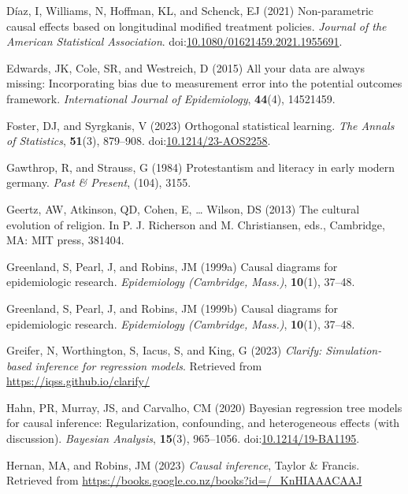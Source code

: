 \documentclass[
  singlecolumn,
  9pt]{article}
\begin{document}
\begin{CSLReferences}
Díaz, I, Williams, N, Hoffman, KL, and Schenck, EJ (2021) Non-parametric
causal effects based on longitudinal modified treatment policies.
\emph{Journal of the American Statistical Association}.
doi:\href{https://doi.org/10.1080/01621459.2021.1955691}{10.1080/01621459.2021.1955691}.

Edwards, JK, Cole, SR, and Westreich, D (2015) All your data are always
missing: Incorporating bias due to measurement error into the potential
outcomes framework. \emph{International Journal of Epidemiology},
\textbf{44}(4), 14521459.

Foster, DJ, and Syrgkanis, V (2023) Orthogonal statistical learning.
\emph{The Annals of Statistics}, \textbf{51}(3), 879--908.
doi:\href{https://doi.org/10.1214/23-AOS2258}{10.1214/23-AOS2258}.

Gawthrop, R, and Strauss, G (1984) Protestantism and literacy in early
modern germany. \emph{Past \& Present}, (104), 3155.

Geertz, AW, Atkinson, QD, Cohen, E, \ldots{} Wilson, DS (2013) The
cultural evolution of religion. In P. J. Richerson and M. Christiansen,
eds., Cambridge, MA: MIT press, 381404.

Greenland, S, Pearl, J, and Robins, JM (1999a) Causal diagrams for
epidemiologic research. \emph{Epidemiology (Cambridge, Mass.)},
\textbf{10}(1), 37--48.

Greenland, S, Pearl, J, and Robins, JM (1999b) Causal diagrams for
epidemiologic research. \emph{Epidemiology (Cambridge, Mass.)},
\textbf{10}(1), 37--48.

Greifer, N, Worthington, S, Iacus, S, and King, G (2023) \emph{Clarify:
Simulation-based inference for regression models}. Retrieved from
\url{https://iqss.github.io/clarify/}

Hahn, PR, Murray, JS, and Carvalho, CM (2020) Bayesian regression tree
models for causal inference: Regularization, confounding, and
heterogeneous effects (with discussion). \emph{Bayesian Analysis},
\textbf{15}(3), 965--1056.
doi:\href{https://doi.org/10.1214/19-BA1195}{10.1214/19-BA1195}.

Hernan, MA, and Robins, JM (2023) \emph{Causal inference}, Taylor \&
Francis. Retrieved from
\url{https://books.google.co.nz/books?id=/_KnHIAAACAAJ}


\end{CSLReferences}
\end{document}
